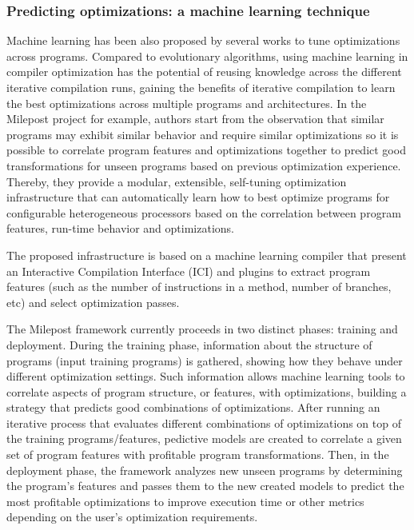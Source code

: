 \subsubsection{Predicting optimizations: a machine learning technique}
Machine learning has been also proposed by several works to tune optimizations across programs. Compared to evolutionary algorithms, using machine learning in compiler optimization has the potential of reusing knowledge across the different iterative compilation runs, gaining the benefits of iterative compilation to learn the best optimizations across multiple programs and architectures.
In the Milepost project\cite{fursin2011milepost} for example, authors start from the observation that similar programs may exhibit similar behavior and require similar optimizations so it is possible to correlate program features and optimizations together to predict good transformations for unseen programs based on previous optimization experience. Thereby, they provide a modular, extensible, self-tuning optimization infrastructure that can automatically learn how to best optimize programs for configurable heterogeneous processors based on the correlation between program features, run-time behavior and optimizations. 

The proposed infrastructure is based on a machine learning compiler that present an Interactive Compilation Interface (ICI) and plugins to extract program features (such as the number of instructions in a method, number of branches, etc) and select optimization passes. 

The Milepost framework currently proceeds in two distinct phases: training and deployment. During the training phase, information about the structure of programs (input training programs) is gathered, showing how they behave under different optimization settings. Such information allows machine learning tools to correlate aspects of program structure, or features, with optimizations, building a strategy that predicts good combinations of optimizations. 
After running an iterative process that evaluates different combinations of optimizations on top of the training programs/features, pedictive models are created to correlate a given set of program features with profitable program transformations. 
Then, in the deployment phase, the framework analyzes new unseen programs by determining the program’s features and passes them to the new created models to predict the most profitable optimizations to improve execution time or other metrics depending on the user’s optimization requirements.

